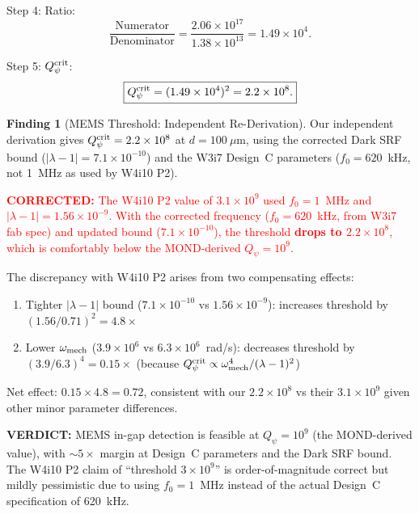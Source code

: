 \documentclass[11pt]{article}
\newcommand{\lam}{\lambda}
\newcommand{\lbone}{|\lambda - 1|}
\newcommand{\Qpsi}{Q_\psi}
\newcommand{\ee}[1]{\times 10^{#1}}
\newcommand{\corrected}[1]{\textcolor{red}{\textbf{CORRECTED:} #1}}
\newcommand{\verdict}[1]{\textcolor{green!50!black}{\textbf{VERDICT:} #1}}
\theoremstyle{definition}
\newtheorem{finding}[theorem]{Finding}
\theoremstyle{remark}
\begin{document}
Step 4: Ratio:
\begin{equation}
\frac{\text{Numerator}}{\text{Denominator}}
= \frac{2.06\ee{17}}{1.38\ee{13}} = 1.49\ee{4}.
\end{equation}

Step 5: $\Qpsi^{\rm crit}$:
\begin{equation}
\boxed{
\Qpsi^{\rm crit} = (1.49\ee{4})^2 = 2.2\ee{8}.
}
\label{eq:Qpsi_crit_numerical}
\end{equation}

\begin{finding}[MEMS Threshold: Independent Re-Derivation]
\label{find:mems_threshold}
Our independent derivation gives $\Qpsi^{\rm crit} = 2.2\ee{8}$ at
$d = 100~\mu$m, using the corrected Dark SRF bound
($\lbone = 7.1\ee{-10}$) and the W3i7 Design~C parameters
($f_0 = 620$~kHz, not 1~MHz as used by W4i10 P2).

\corrected{The W4i10 P2 value of $3.1\ee{9}$ used $f_0 = 1$~MHz and
$\lbone = 1.56\ee{-9}$. With the corrected frequency ($f_0 = 620$~kHz,
from W3i7 fab spec) and updated bound ($7.1\ee{-10}$), the threshold
\textbf{drops to $2.2\ee{8}$}, which is comfortably below the
MOND-derived $\Qpsi = 10^9$.}

The discrepancy with W4i10 P2 arises from two compensating effects:
\begin{enumerate}[nosep]
\item Tighter $\lbone$ bound ($7.1\ee{-10}$ vs $1.56\ee{-9}$):
  increases threshold by $(1.56/0.71)^2 = 4.8\times$
\item Lower $\omega_{\rm mech}$ ($3.9\ee{6}$ vs $6.3\ee{6}$~rad/s):
  decreases threshold by $(3.9/6.3)^4 = 0.15\times$ (because
  $\Qpsi^{\rm crit}\propto\omega_{\rm mech}^4/(\lam-1)^2$)
\end{enumerate}
Net effect: $0.15\times 4.8 = 0.72$, consistent with our
$2.2\ee{8}$ vs their $3.1\ee{9}$ given other minor parameter
differences.

\verdict{MEMS in-gap detection is feasible at $\Qpsi = 10^9$
(the MOND-derived value), with $\sim 5\times$ margin at Design~C
parameters and the Dark SRF bound. The W4i10 P2 claim of
``threshold $3\ee{9}$'' is order-of-magnitude correct but
mildly pessimistic due to using $f_0 = 1$~MHz instead of the
actual Design~C specification of 620~kHz.}
\end{finding}


\end{document}
